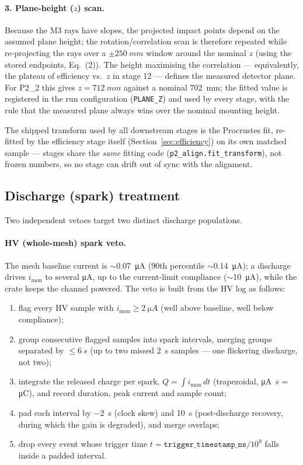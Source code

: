 \documentclass[11pt,a4paper]{article}
\newcommand{\dettwo}{P2\_2}
\newcommand{\code}[1]{\texttt{#1}}
\begin{document}
\paragraph{3. Plane-height ($z$) scan.}
Because the M3 rays have slopes, the projected impact points depend on the
assumed plane height; the rotation/correlation scan is therefore repeated
while re-projecting the rays over a $\pm\SI{250}{mm}$ window around the
nominal $z$ (using the stored endpoints, Eq.~(2)). The height maximising the
correlation --- equivalently, the plateau of efficiency vs.\ $z$ in stage 12
--- defines the measured detector plane. For \dettwo{} this gives
$z = \SI{712}{mm}$ against a nominal \SI{702}{mm}; the fitted value is
registered in the run configuration (\code{PLANE\_Z}) and used by every
stage, with the rule that the measured plane always wins over the nominal
mounting height.

The shipped transform used by all downstream stages is the Procrustes fit,
re-fitted by the efficiency stage itself (Section~\ref{sec:efficiency}) on
its own matched sample --- stages share the \emph{same} fitting code
(\code{p2\_align.fit\_transform}), not frozen numbers, so no stage can drift
out of sync with the alignment.

\subsection{Discharge (spark) treatment}
\label{sec:sparks}

Two independent vetoes target two distinct discharge populations.

\paragraph{HV (whole-mesh) spark veto.}
The mesh baseline current is $\sim$\SI{0.07}{\micro A} (90th percentile
$\sim$\SI{0.14}{\micro A}); a discharge drives $i_\text{mon}$ to several
\si{\micro A}, up to the current-limit compliance ($\sim$\SI{10}{\micro A}),
while the crate keeps the channel powered. The veto is built from the HV log
as follows:

\begin{enumerate}[itemsep=2pt]
  \item flag every HV sample with $i_\text{mon} \ge \SI{2}{\micro A}$
        (well above baseline, well below compliance);
  \item group consecutive flagged samples into spark intervals, merging
        groups separated by $\le \SI{6}{s}$ (up to two missed \SI{2}{s}
        samples --- one flickering discharge, not two);
  \item integrate the released charge per spark,
        $Q = \int i_\text{mon}\,dt$ (trapezoidal, \si{\micro A.s} =
        \si{\micro C}), and record duration, peak current and sample count;
  \item pad each interval by \SI{-2}{s} (clock skew) and \SI{+10}{s}
        (post-discharge recovery, during which the gain is degraded), and
        merge overlaps;
  \item drop every event whose trigger time
        $t = \code{trigger\_timestamp\_ns}/10^9$ falls inside a padded
        interval.
\end{enumerate}
\end{document}
